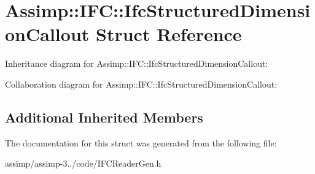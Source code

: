 \hypertarget{struct_assimp_1_1_i_f_c_1_1_ifc_structured_dimension_callout}{\section{Assimp\+:\+:I\+F\+C\+:\+:Ifc\+Structured\+Dimension\+Callout Struct Reference}
\label{struct_assimp_1_1_i_f_c_1_1_ifc_structured_dimension_callout}
}


Inheritance diagram for Assimp\+:\+:I\+F\+C\+:\+:Ifc\+Structured\+Dimension\+Callout\+:


Collaboration diagram for Assimp\+:\+:I\+F\+C\+:\+:Ifc\+Structured\+Dimension\+Callout\+:
\subsection*{Additional Inherited Members}


The documentation for this struct was generated from the following file\+:\begin{DoxyCompactItemize}
\item 
assimp/assimp-\/3../code/I\+F\+C\+Reader\+Gen.\+h\end{DoxyCompactItemize}
